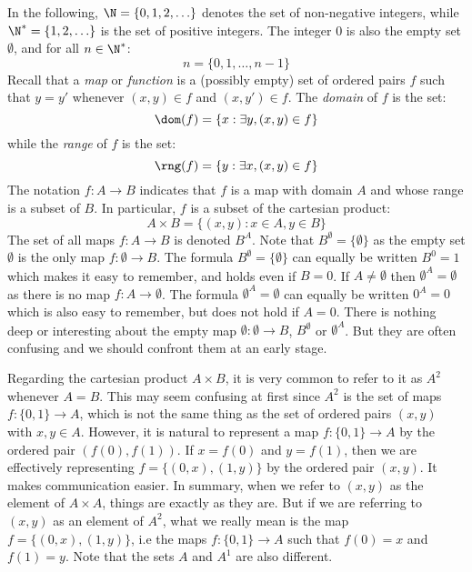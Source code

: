 In the following, $\N=\{0,1,2,\ldots\}$ denotes the set of non-negative
integers, while $\N^{*}=\{1,2,\ldots\}$ is the set of positive
integers. The integer $0$ is also the empty set $\emptyset$, and for
all $n\in\N^{*}$:
    \[
    n=\{0,1,\ldots,n-1\}
    \]
Recall that a {\em map} or {\em function} is a (possibly empty) set
of ordered pairs $f$ such that $y=y'$ whenever $(x,y)\in f$ and
$(x,y')\in f$. The {\em domain} of $f$ is the set:
    \[
    \dom(f)=\{x:\exists y, (x,y)\in f\}
    \]
while the {\em range} of $f$ is the set:
    \[
    \rng(f)=\{y:\exists x, (x,y)\in f\}
    \]
The notation $f:A\to B$
indicates that $f$ is a map with domain $A$
and whose range is a subset of $B$. In particular, $f$ is a subset
of the cartesian product:
    \[
    A\times B=\{(x,y):x\in A, y\in B\}
    \]
The set of all maps $f:A\to B$ is denoted $B^{A}$. Note that
$B^{\emptyset}=\{\emptyset\}$ as the empty set $\emptyset$ is the
only map $f:\emptyset\to B$. The formula
$B^{\emptyset}=\{\emptyset\}$ can equally be written $B^{0} = 1$
which makes it easy to remember, and holds even if $B=0$. If
$A\neq\emptyset$ then $\emptyset^{A}=\emptyset$ as there is no map
$f:A\to\emptyset$. The formula $\emptyset^{A}=\emptyset$ can equally
be written $0^{A}=0$ which is also easy to remember, but does not
hold if $A=0$. There is nothing deep or interesting about the empty
map $\emptyset:\emptyset\to B$, $B^{\emptyset}$ or $\emptyset^{A}$.
But they are often confusing and we should confront them at an early
stage.

Regarding the cartesian product $A\times B$, it is very common to
refer to it as $A^{2}$ whenever $A=B$. This may seem confusing at
first since $A^{2}$ is the set of maps $f:\{0,1\}\to A$, which is
not the same thing as the set of ordered pairs $(x,y)$ with $x,y\in
A$. However, it is natural to represent a map $f:\{0,1\}\to A$ by
the ordered pair $(f(0),f(1))$. If $x=f(0)$ and $y=f(1)$, then we
are effectively representing $f=\{(0,x),(1,y)\}$ by the ordered pair
$(x,y)$. It makes communication easier. In summary, when we refer to
$(x,y)$ as the element of $A\times A$, things are exactly as they
are. But if we are referring to $(x,y)$ as an element of $A^{2}$,
what we really mean is the map $f=\{(0,x),(1,y)\}$, i.e the maps
$f:\{0,1\}\to A$ such that $f(0)=x$ and $f(1)=y$. Note that the sets
$A$ and $A^{1}$ are also different.
